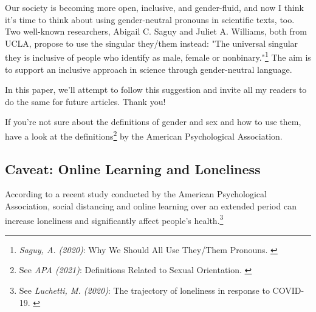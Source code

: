 Our society is becoming more open, inclusive, and gender-fluid, and now I think it's time to think about using gender-neutral pronouns in scientific texts, too. Two well-known researchers, Abigail C. Saguy and Juliet A. Williams, both from UCLA, propose to use the singular they/them instead: "The universal singular they is inclusive of people who identify as male, female or nonbinary."\footnote{\textit{Saguy, A. (2020)}: Why We Should All Use They/Them Pronouns. \cite{pronouns}} The aim is to support an inclusive approach in science through gender-neutral language. 

In this paper, we'll attempt to follow this suggestion and invite all my readers to do the same for future articles. Thank you!

If you're not sure about the definitions of gender and sex and how to use them, have a look at the definitions\footnote{See \textit{APA (2021)}: Definitions Related to Sexual Orientation. \cite{apaDefinitions}} by the American Psychological Association.

\subsection{Caveat: Online Learning and Loneliness}

According to a recent study conducted by the American Psychological Association, social distancing and online learning over an extended period can increase loneliness and significantly affect people's health.\footnote{See \textit{Luchetti, M. (2020)}: The trajectory of loneliness in response to COVID-19. \cite{apaLoneliness}}
